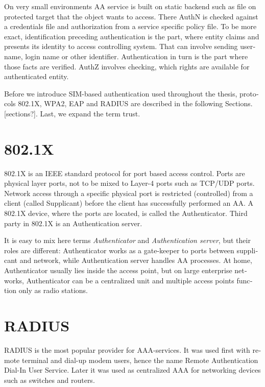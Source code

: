 \documentclass[12pt,a4paper,english]{tutthesis}
\begin{document}
\begin{otherlanguage}{english}
On very small environments AA service is built on static backend such
as file on protected target that the object wants to access. There AuthN
is checked against a credentials file and authorization from a service
specific policy file. 
To be more exact, identification preceding authentication is the part,
where entity claims and presents its identity to 
access controlling system. That can involve sending username, login
name or other identifier. Authentication in turn is the part where
those facts are verified. AuthZ involves checking, which rights are 
available for authenticated entity. 


Before we introduce SIM-based authentication used throughout the
thesis, protocols 802.1X, WPA2, EAP and RADIUS are described in the
following Sections. [sections?]. Last, we expand the term trust.

\section{802.1X}
\label{sec-2-1}

802.1X\cite{8021X} is an IEEE standard protocol for port based access
control. Ports are physical layer ports, not to be mixed to Layer-4 ports such as TCP/UDP ports.
 Network access through a specific physical port is
restricted (controlled) from a client (called Supplicant) before
the client has successfully performed an AA. A 802.1X device, where
the ports are located, is called the Authenticator. Third party in 802.1X is an
Authentication server. 



It is easy to mix here terms \emph{Authenticator} and \emph{Authentication
server}, but their roles are different: Authenticator works as a
gate-keeper to ports between supplicant and network, while
Authentication server handles AA processes.
At home, Authenticator usually lies inside the access point, but 
on large enterprise networks, Authenticator can be a centralized unit 
and multiple access points function only as radio stations.



\section{RADIUS}
\label{sec-2-2}
\label{sec:radius}
RADIUS is the most popular provider for 
AAA-services\cite[p.75]{radius-popular}.  It was used first with remote terminal
and dial-up modem users, hence the name Remote Authentication Dial-In
User Service. Later it was used as centralized AAA for networking
devices such as switches and routers.  











\end{otherlanguage}
\end{document}
